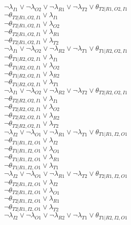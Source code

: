 $\neg\lambda_{I1} \vee \neg\lambda_{O2} \vee \neg\lambda_{R1} \vee \neg\lambda_{T2} \vee \theta_{T2|R1,O2,I1}$\\
$\neg\theta_{T2|R1,O2,I1} \vee \lambda_{I1}$\\
$\neg\theta_{T2|R1,O2,I1} \vee \lambda_{O2}$\\
$\neg\theta_{T2|R1,O2,I1} \vee \lambda_{R1}$\\
$\neg\theta_{T2|R1,O2,I1} \vee \lambda_{T2}$\\
$\neg\lambda_{I1} \vee \neg\lambda_{O2} \vee \neg\lambda_{R2} \vee \neg\lambda_{T1} \vee \theta_{T1|R2,O2,I1}$\\
$\neg\theta_{T1|R2,O2,I1} \vee \lambda_{I1}$\\
$\neg\theta_{T1|R2,O2,I1} \vee \lambda_{O2}$\\
$\neg\theta_{T1|R2,O2,I1} \vee \lambda_{R2}$\\
$\neg\theta_{T1|R2,O2,I1} \vee \lambda_{T1}$\\
$\neg\lambda_{I1} \vee \neg\lambda_{O2} \vee \neg\lambda_{R2} \vee \neg\lambda_{T2} \vee \theta_{T2|R2,O2,I1}$\\
$\neg\theta_{T2|R2,O2,I1} \vee \lambda_{I1}$\\
$\neg\theta_{T2|R2,O2,I1} \vee \lambda_{O2}$\\
$\neg\theta_{T2|R2,O2,I1} \vee \lambda_{R2}$\\
$\neg\theta_{T2|R2,O2,I1} \vee \lambda_{T2}$\\
$\neg\lambda_{I2} \vee \neg\lambda_{O1} \vee \neg\lambda_{R1} \vee \neg\lambda_{T1} \vee \theta_{T1|R1,I2,O1}$\\
$\neg\theta_{T1|R1,I2,O1} \vee \lambda_{I2}$\\
$\neg\theta_{T1|R1,I2,O1} \vee \lambda_{O1}$\\
$\neg\theta_{T1|R1,I2,O1} \vee \lambda_{R1}$\\
$\neg\theta_{T1|R1,I2,O1} \vee \lambda_{T1}$\\
$\neg\lambda_{I2} \vee \neg\lambda_{O1} \vee \neg\lambda_{R1} \vee \neg\lambda_{T2} \vee \theta_{T2|R1,I2,O1}$\\
$\neg\theta_{T2|R1,I2,O1} \vee \lambda_{I2}$\\
$\neg\theta_{T2|R1,I2,O1} \vee \lambda_{O1}$\\
$\neg\theta_{T2|R1,I2,O1} \vee \lambda_{R1}$\\
$\neg\theta_{T2|R1,I2,O1} \vee \lambda_{T2}$\\
$\neg\lambda_{I2} \vee \neg\lambda_{O1} \vee \neg\lambda_{R2} \vee \neg\lambda_{T1} \vee \theta_{T1|R2,I2,O1}$\\
